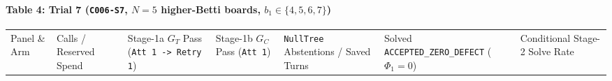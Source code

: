 \documentclass[
  11pt,
]{article}
\newcommand{\passthrough}[1]{#1}
\begin{document}
\paragraph{\texorpdfstring{Table 4: Trial 7 (\texttt{C006-S7}, \(N = 5\)
higher-Betti boards,
\(b_1 \in \{4,\allowbreak  5,\allowbreak  6,\allowbreak  7\}\))}{Table 4: Trial 7 (C006-S7, N = 5 higher-Betti boards, b\_1 \textbackslash in \textbackslash\{4,\textbackslash allowbreak  5,\textbackslash allowbreak  6,\textbackslash allowbreak  7\textbackslash\})}}\label{table-4-trial-7-c006-s7-n-5-higher-betti-boards-b_1-in-4-5-6-7}

\begingroup\begin{landscape}\small
\begin{longtable}[]{@{}
  >{\raggedright\arraybackslash}p{}
  >{\raggedright\arraybackslash}p{}
  >{\raggedright\arraybackslash}p{}
  >{\raggedright\arraybackslash}p{}
  >{\raggedright\arraybackslash}p{}
  >{\raggedright\arraybackslash}p{}
  >{\raggedright\arraybackslash}p{}@{}}
\toprule\noalign{}
\begin{minipage}[b]{\linewidth}\raggedright
Panel \& Arm
\end{minipage} & \begin{minipage}[b]{\linewidth}\raggedright
Calls / Reserved Spend
\end{minipage} & \begin{minipage}[b]{\linewidth}\raggedright
Stage-1a \(G_T\) Pass (\passthrough{\lstinline!Att 1 -> Retry 1!})
\end{minipage} & \begin{minipage}[b]{\linewidth}\raggedright
Stage-1b \(G_C\) Pass (\passthrough{\lstinline!Att 1!})
\end{minipage} & \begin{minipage}[b]{\linewidth}\raggedright
\passthrough{\lstinline!NullTree!} Abstentions / Saved Turns
\end{minipage} & \begin{minipage}[b]{\linewidth}\raggedright
Solved \nolinkurl{ACCEPTED_ZERO_DEFECT} (\(\Phi_1 = 0\))
\end{minipage} & \begin{minipage}[b]{\linewidth}\raggedright
Conditional Stage-2 Solve Rate
\end{minipage} \\

\end{longtable}
\end{landscape}
\end{document}
